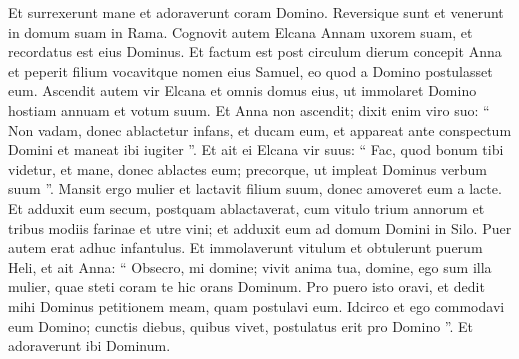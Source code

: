 \begin{biblechapter}
\verse Et surrexerunt mane et adoraverunt coram Domino.
 Reversique sunt et venerunt in domum suam in Rama. Cognovit autem Elcana Annam uxorem suam, et recordatus est eius Dominus. 
\verse Et factum est post circulum dierum concepit Anna et peperit filium vocavitque nomen eius Samuel, eo quod a Domino postulasset eum.
 \verse Ascendit autem vir Elcana et omnis domus eius, ut immolaret Domino hostiam annuam et votum suum. 
\verse Et Anna non ascendit; dixit enim viro suo: “ Non vadam, donec ablactetur infans, et ducam eum, et appareat ante conspectum Domini et maneat ibi iugiter ”. 
\verse Et ait ei Elcana vir suus: “ Fac, quod bonum tibi videtur, et mane, donec ablactes eum; precorque, ut impleat Dominus verbum suum ”. Mansit ergo mulier et lactavit filium suum, donec amoveret eum a lacte.
 \verse Et adduxit eum secum, postquam ablactaverat, cum vitulo trium annorum et tribus modiis farinae et utre vini; et adduxit eum ad domum Domini in Silo. Puer autem erat adhuc infantulus. 
\verse Et immolaverunt vitulum et obtulerunt puerum Heli, 
\verse et ait Anna: “ Obsecro, mi domine; vivit anima tua, domine, ego sum illa mulier, quae steti coram te hic orans Dominum. 
\verse Pro puero isto oravi, et dedit mihi Dominus petitionem meam, quam postulavi eum. 
\verse Idcirco et ego commodavi eum Domino; cunctis diebus, quibus vivet, postulatus erit pro Domino ”.
 Et adoraverunt ibi Dominum.
 

\end{biblechapter}
